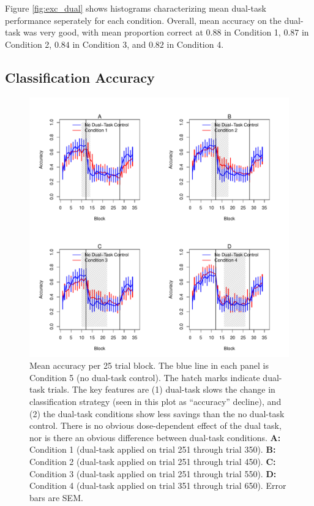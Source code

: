 \documentclass[man,apacite,draftfirst]{apa6} \usepackage{amsmath}
\begin{document}
Figure \ref{fig:exc_dual} shows histograms characterizing mean dual-task
performance seperately for each condition. Overall, mean accuracy on the
dual-task was very good, with mean proportion correct at $0.88$ in Condition 1,
$0.87$ in Condition 2, $0.84$ in Condition 3, and $0.82$ in Condition 4.

\subsection*{Classification Accuracy}
\begin{figure}[t]
\centering \includegraphics[width=1.0\textwidth]{../figures/fig_learning_curves.pdf}
  \caption{ Mean accuracy per 25 trial block. The blue line in each panel is
Condition 5 (no dual-task control). The hatch marks indicate dual-task trials.
The key features are (1) dual-task slows the change in classification strategy
(seen in this plot as ``accuracy'' decline), and (2) the dual-task conditions
show less savings than the no dual-task control. There is no obvious
dose-dependent effect of the dual task, nor is there an obvious difference
between dual-task conditions. \textbf{A:} Condition 1 (dual-task applied on
trial 251 through trial 350). \textbf{B:} Condition 2 (dual-task applied on
trial 251 through trial 450). \textbf{C:} Condition 3 (dual-task applied on
trial 251 through trial 550). \textbf{D:} Condition 4 (dual-task applied on
trial 351 through trial 650). Error bars are SEM. }
  \label{fig:learning_curves}
\end{figure}
\end{document}

